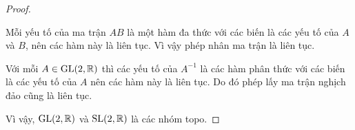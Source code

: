 \begin{proof}
\begin{enumerate}
    Mỗi yếu tố của ma trận $AB$ là một hàm đa thức với các biến là các yếu tố của $A$ và $B$, nên các hàm này là liên tục. Vì vậy phép nhân ma trận là liên tục. 
    
    Với mỗi $A \in \operatorname{GL}(2,\mathbb{R})$ thì các yếu tố của $A^{-1}$ là các hàm phân thức với các biến là các yếu tố của $A$ nên các hàm này là liên tục. Do đó phép lấy ma trận nghịch đảo cũng là liên tục.
    \end{enumerate}
    


    Vì vậy, $\operatorname{GL}(2,\mathbb{R})$ và $\operatorname{SL}(2,\mathbb{R})$ là các nhóm topo.
    
\end{proof}











        

